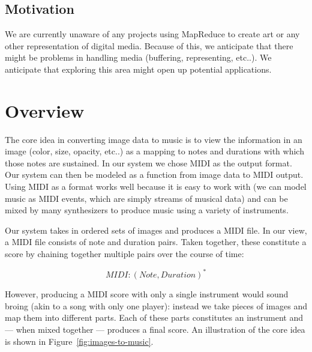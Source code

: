 \documentclass[10pt, conference, compsocconf]{IEEEtran}
\begin{document}
\subsection{Motivation} 

We are currently unaware of any projects using MapReduce to create art
or any other representation of digital media.  Because of this, we
anticipate that there might be problems in handling media (buffering,
representing, etc..).  We anticipate that exploring this area might
open up potential applications.

\section{Overview}
\label{sec:overview}

The core idea in converting image data to music is to view the
information in an image (color, size, opacity, etc..) as a mapping to
notes and durations with which those notes are sustained.  In our
system we chose MIDI as the output format.  Our system can then be
modeled as a function from image data to MIDI output.  Using MIDI as a
format works well because it is easy to work with (we can model music
as MIDI events, which are simply streams of musical data) and can be
mixed by many synthesizers to produce music using a variety of
instruments.

Our system takes in ordered sets of images and produces a MIDI file.
In our view, a MIDI file consists of note and duration pairs.  Taken
together, these constitute a score by chaining together multiple pairs
over the course of time:

\[
MIDI : (Note,Duration)^{\ast}
\]

However, producing a MIDI score with only a single instrument would
sound broing (akin to a song with only one player): instead we take
pieces of images and map them into different parts.  Each of these
parts constitutes an instrument and --- when mixed together ---
produces a final score.  An illustration of the core idea is shown in
Figure~\ref{fig:images-to-music}.
\end{document}
